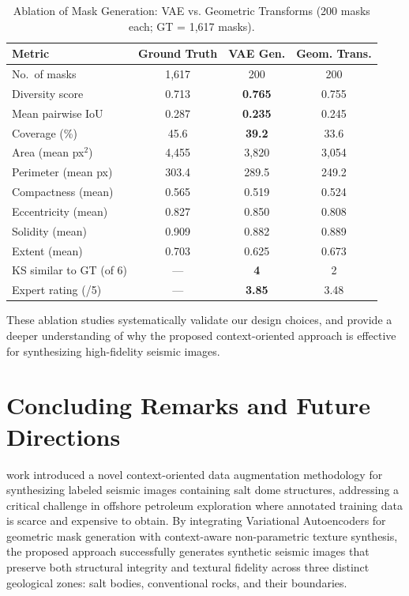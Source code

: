 \documentclass{ieeeaccess}
\begin{document}
\begin{table}[!t]
\caption{Ablation of Mask Generation: VAE vs. Geometric Transforms (200 masks each; GT = 1,617 masks).}
\label{tab:ablation_masks}
\centering
\begin{tabular}{lccc}
\toprule
\textbf{Metric} & \textbf{Ground Truth} & \textbf{VAE Gen.} & \textbf{Geom. Trans.} \\
\midrule
No.\ of masks            & 1,617  & 200    & 200    \\
Diversity score          & 0.713  & \textbf{0.765}  & 0.755  \\
Mean pairwise IoU        & 0.287  & \textbf{0.235}  & 0.245  \\
Coverage (\%)            & 45.6   & \textbf{39.2}   & 33.6   \\
\midrule
Area (mean px$^2$)       & 4,455  & 3,820  & 3,054  \\
Perimeter (mean px)      & 303.4  & 289.5  & 249.2  \\
Compactness (mean)       & 0.565  & 0.519  & 0.524  \\
Eccentricity (mean)      & 0.827  & 0.850  & 0.808  \\
Solidity (mean)          & 0.909  & 0.882  & 0.889  \\
Extent (mean)            & 0.703  & 0.625  & 0.673  \\
\midrule
KS similar to GT (of 6)  & ---    & \textbf{4}      & 2      \\
Expert rating (/5)       & ---    & \textbf{3.85}   & 3.48     \\
\bottomrule
\end{tabular}
\end{table}

These ablation studies systematically validate our design choices, and provide a deeper understanding of why the proposed context-oriented approach is effective for synthesizing high-fidelity seismic images.


\section{Concluding Remarks and Future Directions}
\label{sec:conclusion}

 work introduced a novel context-oriented data augmentation methodology for synthesizing labeled seismic images containing salt dome structures, addressing a critical challenge in offshore petroleum exploration where annotated training data is scarce and expensive to obtain. By integrating Variational Autoencoders for geometric mask generation with context-aware non-parametric texture synthesis, the proposed approach successfully generates synthetic seismic images that preserve both structural integrity and textural fidelity across three distinct geological zones: salt bodies, conventional rocks, and their boundaries.
\end{document}
